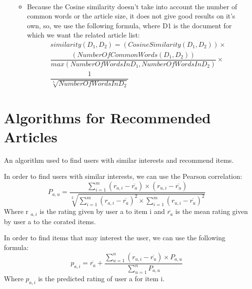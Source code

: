 \begin{itemize}
\begin{itemize}
\begin{equation}
\begin{split}
			\end{split}
		\end{equation}
		\item Because the Cosine similarity doesn’t take into account the number of common words or the article size, it does not give good results on it’s own, so, we use the following formula, where D1 is the document for which we want the related article list:
		\begin{equation}
			\begin{split}
				similarity(D_{1},D_{2}) = (Cosine Similarity(D_{1}, D_{2})) \times \\
				\dfrac {(Number Of Common Words(D_{1}, D_{2}))} {max(Number Of Words In D_{1}, Number Of Words In D_{2})} \times \\
				\dfrac {1} {\sqrt[5] {Number Of Words In D_{2}}}
			\end{split}
		\end{equation}
	\end{itemize}
\end{itemize}


\section{Algorithms for Recommended Articles}
\label{sec:algorithms-for-recommended-articles}

An algorithm used to find users with similar interests and recommend items.

In order to find users with similar interests, we can use the Pearson correlation:
\begin{equation}
	P_{a,u} = \dfrac {\sum_{i=1}^{m}(r_{a,i} - \overline{r_{a}})\times(r_{u,i} - \overline{r_{u}})}{\sqrt[2]{\sum_{i=1}^{m}(r_{a,i} - \overline{r_{a}})^{2}\times \sum_{i=1}^{m}(r_{u,i} - \overline{r_{u}})^{2}}}
\end{equation}
Where r $_{a,i}$ is the rating given by user a to item i and $\overline{r_{a}}$ is the mean rating given by user a to the corated items.

In order to find items that may interest the user, we can use the following formula:
 \begin{equation}
 	p_{a,i} = \overline {r_{a}} + \dfrac{\sum_{u=1}^{n} (r_{u,i} - \overline{r_{u}}) \times P_{a,u}}{\sum_{u=1}^{n} P_{a,u}} 
 \end{equation}
Where $p_{a,i}$ is the predicted rating of user a for item i.
